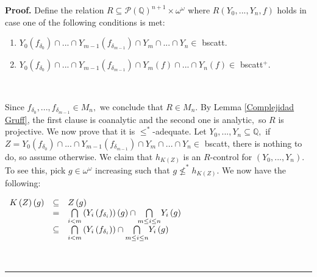 \documentclass{article}%
\newenvironment{proof}[1][Proof]{\noindent\textbf{#1.} }{\ \rule{0.5em}{0.5em}}
\begin{document}
\begin{proof}
Define the relation $R\subseteq\mathcal{P}\left(  \mathbb{Q}\right)
^{n+1}\times\omega^{\omega}$ where $R\left(  Y_{0},...,Y_{n},f\right)  $ holds
in case one of the following conditions is met:

\begin{enumerate}
\item $Y_{0}\left(  f_{\delta_{0}}\right)  \cap...\cap Y_{m-1}\left(
f_{\delta_{m-1}}\right)  \cap Y_{m}\cap...\cap Y_{n}\in$ \textsf{bscatt.}

\item $Y_{0}\left(  f_{\delta_{0}}\right)  \cap...\cap Y_{m-1}\left(
f_{\delta_{m-1}}\right)  \cap Y_{m}\left(  f\right)  \cap...\cap Y_{n}\left(
f\right)  \in$ \textsf{bscatt}$^{+}$\textsf{.}
\end{enumerate}

\qquad\ \ 

Since $f_{\delta_{0}},...,f_{\delta_{m-1}}\in M_{n},$ we conclude that $R\in
M_{n}.$ By Lemma \ref{Complejidad Gruff}, the first clause is coanalytic and
the second one is analytic$,$ so $R$ is projective. We now prove that it is
$\leq^{\ast}$-adequate. Let $Y_{0},...,Y_{n}\subseteq\mathbb{Q},$ if
$Z=Y_{0}\left(  f_{\delta_{0}}\right)  \cap...\cap Y_{m-1}\left(
f_{\delta_{m-1}}\right)  \cap Y_{m}\cap...\cap Y_{n}\in$ \textsf{bscatt},
there is nothing to do, so assume otherwise. We claim that $h_{K\left(
Z\right)  }$ is an $R$-control for $\left(  Y_{0},...,Y_{n}\right)  .$ To see
this, pick $g\in\omega^{\omega}$ increasing such that $g\nleq^{\ast
}h_{K\left(  Z\right)  }.$ We now have the following:\bigskip

$\hfill%
\begin{array}
[c]{lll}%
K\left(  Z\right)  \left(  g\right)  & \subseteq & Z\left(  g\right) \\
& = &
{\textstyle\bigcap\limits_{i<m}}
\left(  Y_{i}\left(  f_{\delta_{i}}\right)  \right)  \left(  g\right)  \cap%
{\textstyle\bigcap\limits_{m\leq i\leq n}}
Y_{i}\left(  g\right) \\
& \subseteq &
{\textstyle\bigcap\limits_{i<m}}
\left(  Y_{i}\left(  f_{\delta_{i}}\right)  \right)  \cap%
{\textstyle\bigcap\limits_{m\leq i\leq n}}
Y_{i}\left(  g\right)
\end{array}
\qquad\ \hfill$


\end{proof}
\end{document}
